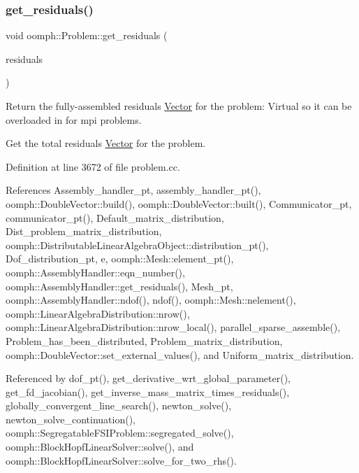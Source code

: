 \subsubsection{\texorpdfstring{get\+\_\+residuals()}{get\_residuals()}}
{\footnotesize\ttfamily void oomph\+::\+Problem\+::get\+\_\+residuals (\begin{DoxyParamCaption}\item[{\hyperlink{classoomph_1_1DoubleVector}{Double\+Vector} \&}]{residuals }\end{DoxyParamCaption})\hspace{0.3cm}{\ttfamily [virtual]}}



Return the fully-\/assembled residuals \hyperlink{classoomph_1_1Vector}{Vector} for the problem\+: Virtual so it can be overloaded in for mpi problems. 

Get the total residuals \hyperlink{classoomph_1_1Vector}{Vector} for the problem. 

Definition at line 3672 of file problem.\+cc.



References Assembly\+\_\+handler\+\_\+pt, assembly\+\_\+handler\+\_\+pt(), oomph\+::\+Double\+Vector\+::build(), oomph\+::\+Double\+Vector\+::built(), Communicator\+\_\+pt, communicator\+\_\+pt(), Default\+\_\+matrix\+\_\+distribution, Dist\+\_\+problem\+\_\+matrix\+\_\+distribution, oomph\+::\+Distributable\+Linear\+Algebra\+Object\+::distribution\+\_\+pt(), Dof\+\_\+distribution\+\_\+pt, e, oomph\+::\+Mesh\+::element\+\_\+pt(), oomph\+::\+Assembly\+Handler\+::eqn\+\_\+number(), oomph\+::\+Assembly\+Handler\+::get\+\_\+residuals(), Mesh\+\_\+pt, oomph\+::\+Assembly\+Handler\+::ndof(), ndof(), oomph\+::\+Mesh\+::nelement(), oomph\+::\+Linear\+Algebra\+Distribution\+::nrow(), oomph\+::\+Linear\+Algebra\+Distribution\+::nrow\+\_\+local(), parallel\+\_\+sparse\+\_\+assemble(), Problem\+\_\+has\+\_\+been\+\_\+distributed, Problem\+\_\+matrix\+\_\+distribution, oomph\+::\+Double\+Vector\+::set\+\_\+external\+\_\+values(), and Uniform\+\_\+matrix\+\_\+distribution.



Referenced by dof\+\_\+pt(), get\+\_\+derivative\+\_\+wrt\+\_\+global\+\_\+parameter(), get\+\_\+fd\+\_\+jacobian(), get\+\_\+inverse\+\_\+mass\+\_\+matrix\+\_\+times\+\_\+residuals(), globally\+\_\+convergent\+\_\+line\+\_\+search(), newton\+\_\+solve(), newton\+\_\+solve\+\_\+continuation(), oomph\+::\+Segregatable\+F\+S\+I\+Problem\+::segregated\+\_\+solve(), oomph\+::\+Block\+Hopf\+Linear\+Solver\+::solve(), and oomph\+::\+Block\+Hopf\+Linear\+Solver\+::solve\+\_\+for\+\_\+two\+\_\+rhs().


